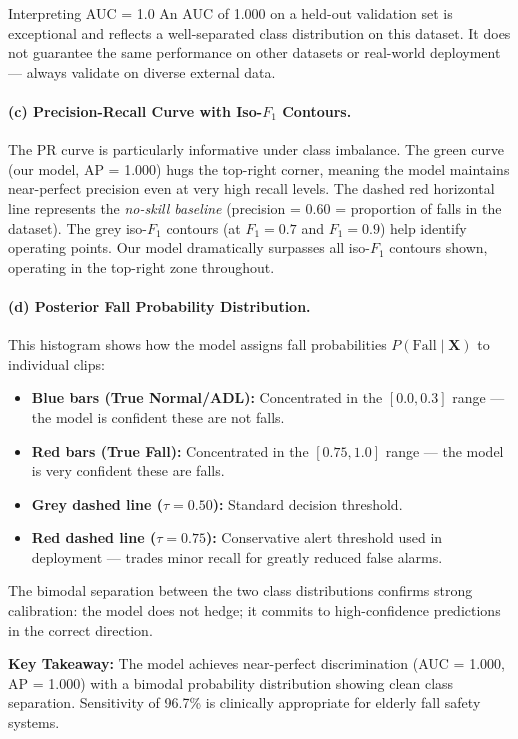 \documentclass[12pt,a4paper]{article}
\begin{document}
\begin{warnbox}{Interpreting AUC = 1.0}
An AUC of 1.000 on a held-out validation set is exceptional and reflects a well-separated class distribution on this dataset. It does not guarantee the same performance on other datasets or real-world deployment — always validate on diverse external data.
\end{warnbox}

\paragraph{(c) Precision-Recall Curve with Iso-$F_1$ Contours.}
The PR curve is particularly informative under class imbalance. The green curve (our model, AP = 1.000) hugs the top-right corner, meaning the model maintains near-perfect precision even at very high recall levels. The dashed red horizontal line represents the \emph{no-skill baseline} (precision = 0.60 = proportion of falls in the dataset). The grey iso-$F_1$ contours (at $F_1{=}0.7$ and $F_1{=}0.9$) help identify operating points. Our model dramatically surpasses all iso-$F_1$ contours shown, operating in the top-right zone throughout.

\paragraph{(d) Posterior Fall Probability Distribution.}
This histogram shows how the model assigns fall probabilities $P(\text{Fall}\mid\mathbf{X})$ to individual clips:
\begin{itemize}[itemsep=2pt]
    \item \textbf{Blue bars (True Normal/ADL):} Concentrated in the $[0.0, 0.3]$ range — the model is confident these are not falls.
    \item \textbf{Red bars (True Fall):} Concentrated in the $[0.75, 1.0]$ range — the model is very confident these are falls.
    \item \textbf{Grey dashed line ($\tau{=}0.50$):} Standard decision threshold.
    \item \textbf{Red dashed line ($\tau{=}0.75$):} Conservative alert threshold used in deployment — trades minor recall for greatly reduced false alarms.
\end{itemize}
The bimodal separation between the two class distributions confirms strong calibration: the model does not hedge; it commits to high-confidence predictions in the correct direction.

\begin{resultbox}
\textbf{Key Takeaway:} The model achieves near-perfect discrimination (AUC = 1.000, AP = 1.000) with a bimodal probability distribution showing clean class separation. Sensitivity of 96.7\% is clinically appropriate for elderly fall safety systems.
\end{resultbox}
\end{document}
